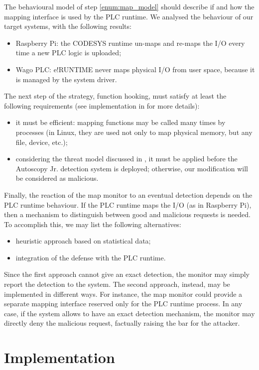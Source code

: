 The behavioural model of step \ref{enum:map_model} should describe if and how the mapping interface is used by the PLC runtime.
We analysed the behaviour of our target systems, with the following results:
\begin{itemize}
	\item Raspberry Pi: the CODESYS runtime un-maps and re-maps the I/O every time a new PLC logic is uploaded;
	\item Wago PLC: e!RUNTIME never maps physical I/O from user space, because it is managed by the system driver.
\end{itemize}
The next step of the strategy, function hooking, must satisfy at least the following requirements (see implementation in  for more details):
\begin{itemize}
	\item it must be efficient: mapping functions may be called many times by processes (\eg in Linux, they are used not only to map physical memory,
		but any file, device, etc.);
	\item considering the threat model discussed in , it must be applied before the Autoscopy Jr. detection system is deployed;
		otherwise, our modification will be considered as malicious.
\end{itemize}

Finally, the reaction of the map monitor to an eventual detection depends on the PLC runtime behaviour. If the PLC runtime maps the I/O (as in Raspberry Pi),
then a mechanism to distinguish between good and malicious requests is needed. To accomplish this, we may list the following alternatives:
\begin{itemize}
	\item heuristic approach based on statistical data;
	\item integration of the defense with the PLC runtime.
\end{itemize}
Since the first approach cannot give an exact detection, the monitor may simply report the detection to the system.
The second approach, instead, may be implemented in different ways. For instance, the map monitor could provide a separate mapping interface
reserved only for the PLC runtime process.
In any case, if the system allows to have an exact detection mechanism, the monitor may directly deny the malicious request, factually raising the bar for the attacker.


\section{Implementation}
\label{sec:def_impl}

